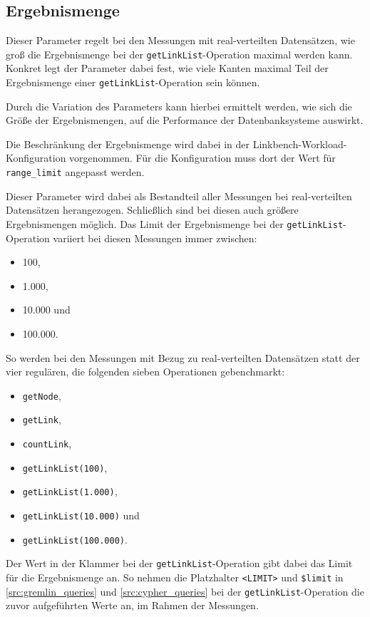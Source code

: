 \subsection{Ergebnismenge}
\label{analyse:parameter:ergebnismenge}
Dieser Parameter regelt bei den Messungen mit real-verteilten Datensätzen, wie groß die Ergebnismenge bei der \texttt{getLinkList}-Operation maximal werden kann. Konkret legt der Parameter dabei fest, wie viele Kanten maximal Teil der Ergebnismenge einer \texttt{getLinkList}-Operation sein können.

Durch die Variation des Parameters kann hierbei ermittelt werden, wie sich die Größe der Ergebnismengen, auf die Performance der Datenbanksysteme auswirkt. 

Die Beschränkung der Ergebnismenge wird dabei in der Linkbench-Workload-Konfiguration vorgenommen. Für die Konfiguration muss dort der Wert für \texttt{range\_limit} angepasst werden. 

Dieser Parameter wird dabei als Bestandteil aller Messungen bei real-verteilten Datensätzen herangezogen. Schließlich sind bei diesen auch größere Ergebnismengen möglich. Das Limit der Ergebnismenge bei der \texttt{getLinkList}-Operation variiert bei diesen Messungen immer zwischen: 
\begin{itemize}
    \item 100,
    \item 1.000,
    \item 10.000 und
    \item 100.000.
\end{itemize}

So werden bei den Messungen mit Bezug zu real-verteilten Datensätzen statt der vier regulären, die folgenden sieben Operationen gebenchmarkt:
\begin{itemize}
    \item \texttt{getNode},
    \item \texttt{getLink},
    \item \texttt{countLink},
    \item \texttt{getLinkList(100)},
    \item \texttt{getLinkList(1.000)},
    \item \texttt{getLinkList(10.000)} und
    \item \texttt{getLinkList(100.000)}.
\end{itemize}

Der Wert in der Klammer bei der \texttt{getLinkList}-Operation gibt dabei das Limit für die Ergebnismenge an. So nehmen die Platzhalter \texttt{<LIMIT>} und \texttt{\$limit}
in \autoref{src:gremlin_queries} und \autoref{src:cypher_queries} bei der \texttt{getLinkList}-Operation die zuvor aufgeführten Werte an, im Rahmen der Messungen.

